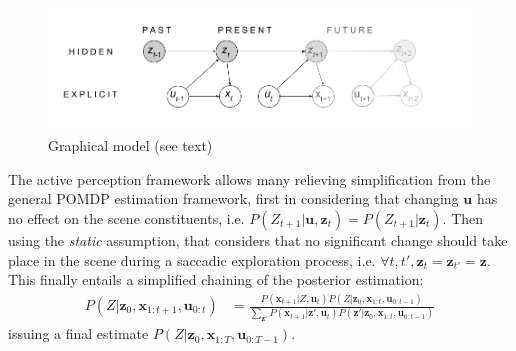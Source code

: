 \documentclass{article} %
\begin{document}
\begin{figure}[t!]
	\centerline{
		\includegraphics[width = \linewidth]{img/ICLR-graphical-v2.png} 
	}
	\caption{Graphical model (see text)}\label{fig:graphical}
\end{figure}


The active perception framework allows many relieving simplification from the general POMDP estimation framework, first in considering that changing $\boldsymbol{u}$ has no effect on the scene constituents, i.e. $P(Z_{t+1}|\boldsymbol{u},\boldsymbol{z}_t) = P(Z_{t+1}|\boldsymbol{z}_t)$. Then using the \emph{static} assumption, that considers that no significant change should take place in the scene during a saccadic exploration process, i.e. $\forall t, t', \boldsymbol{z}_{t} = \boldsymbol{z}_{t'} = \boldsymbol{z}$. This finally entails a simplified chaining of the posterior estimation:
 	\begin{align}
 	P(Z|\boldsymbol{z}_0,\boldsymbol{x}_{1:t+1},\boldsymbol{u}_{0:t}) &= \frac{P(\boldsymbol{x}_{t+1}|Z,\boldsymbol{u}_t) P(Z|\boldsymbol{z}_0,\boldsymbol{x}_{1:t}, \boldsymbol{u}_{0:t-1})}{\sum_{\boldsymbol{z}'}P(\boldsymbol{x}_{t+1}|\boldsymbol{z}',\boldsymbol{u}_t) P(\boldsymbol{z}'|\boldsymbol{z}_0,\boldsymbol{x}_{1:t}, \boldsymbol{u}_{0:t-1})}
 	\end{align}
issuing a final estimate $P(Z|\boldsymbol{z}_0, \boldsymbol{x}_{1:T}, \boldsymbol{u}_{0:T-1})$.  
\end{document}
